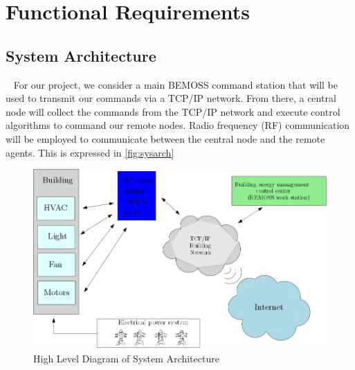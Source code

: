 \documentclass[letterpaper,12pt]{article}   %
\begin{document}



\section{Functional Requirements}

\subsection{System Architecture}~
For our project, we consider a main BEMOSS command station that will be used to transmit our commands via a TCP/IP network. From there, a central node will collect the commands from the TCP/IP network and execute control algorithms to command our remote nodes. Radio frequency (RF) communication will be employed to communicate between the central node and the remote agents. This is expressed in \autoref{fig:sysarch}

\begin{figure}
    \centering
    \includegraphics[scale=.5]{figs/ipe/BEMOSSHighLevel1.png}
    \caption{High Level Diagram of System Architecture}
    \label{fig:sysarch}
\end{figure}
\end{document}
